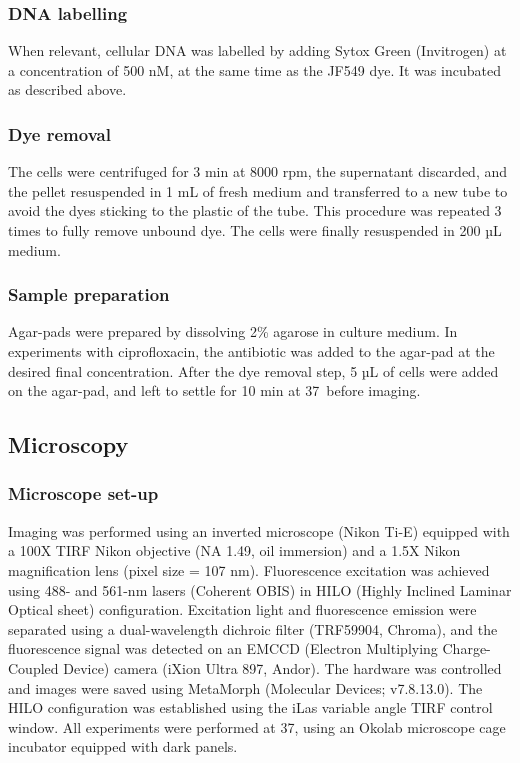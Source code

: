 \subsubsection*{DNA labelling}
When relevant, cellular DNA was labelled by adding Sytox Green (Invitrogen) at a concentration of 500 nM, at the same time as the JF549 dye. It was incubated as described above.
\subsubsection*{Dye removal}
The cells were centrifuged for 3 min at 8000 rpm, the supernatant discarded, and the pellet resuspended in 1 mL of fresh medium and transferred to a new tube to avoid the dyes sticking to the plastic of the tube. This procedure was repeated 3 times to fully remove unbound dye. The cells were finally resuspended in 200 µL medium.
\subsubsection*{Sample preparation}
Agar-pads were prepared by dissolving 2\% agarose in culture medium. In experiments with ciprofloxacin, the antibiotic was added to the agar-pad at the desired final concentration. After the dye removal step, 5 µL of cells were added on the agar-pad, and left to settle for 10 min at 37\celsius\ before imaging.

\subsection*{Microscopy}
\subsubsection*{Microscope set-up}
Imaging was performed using an inverted microscope (Nikon Ti-E) equipped with a 100X TIRF Nikon objective (NA 1.49, oil immersion) and a 1.5X Nikon magnification lens (pixel size = 107 nm). Fluorescence excitation was achieved using 488- and 561-nm lasers (Coherent OBIS) in HILO (Highly Inclined Laminar Optical sheet) configuration. Excitation light and fluorescence emission were separated using a dual-wavelength dichroic filter (TRF59904, Chroma), and the fluorescence signal was detected on an EMCCD (Electron Multiplying Charge-Coupled Device) camera (iXion Ultra 897, Andor). The hardware was controlled and images were saved using MetaMorph (Molecular Devices; v7.8.13.0). The HILO configuration was established using the iLas variable angle TIRF control window. All experiments were performed at 37\celsius, using an Okolab microscope cage incubator equipped with dark panels.

